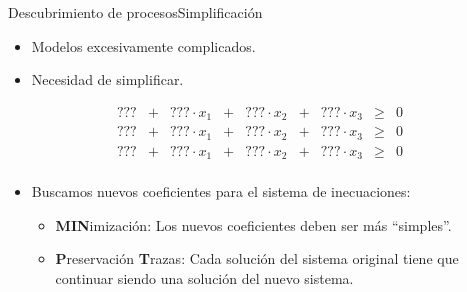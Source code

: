 \documentclass[spanish,pdf]{beamer}
\begin{document}
\begin{frame}{Descubrimiento de procesos}{Simplificación}
  \begin{minipage}[c][0.2\textheight][c]{\linewidth}
  \begin{itemize}
      \item<1-> Modelos excesivamente complicados.
      \item<1-> Necesidad de simplificar. 
  \end{itemize}
  \end{minipage}
\pause[2]
  \begin{minipage}[c][0.2\textheight][c]{\linewidth}
    $$\begin{array}{rcccccccl}
        ??? & + & ??? \cdot x_1 & + & ??? \cdot x_2 & + & ??? \cdot x_3 & \ge & 0 \\
        ??? & + & ??? \cdot x_1 & + & ??? \cdot x_2 & + & ??? \cdot x_3 & \ge & 0 \\
        ??? & + & ??? \cdot x_1 & + & ??? \cdot x_2 & + & ??? \cdot x_3 & \ge & 0 \\
    \end{array}$$
  \end{minipage}
  \begin{itemize}
      \item<3-> Buscamos nuevos coeficientes para el sistema de inecuaciones: 
        \begin{itemize}
            \item \textbf{MIN}imización: Los nuevos coeficientes deben ser más ``simples''.
            \item \textbf{P}reservación \textbf{T}razas: Cada solución del sistema original tiene que continuar siendo
                una solución del nuevo sistema.
        \end{itemize}
  \end{itemize}
\end{frame}
\end{document}

